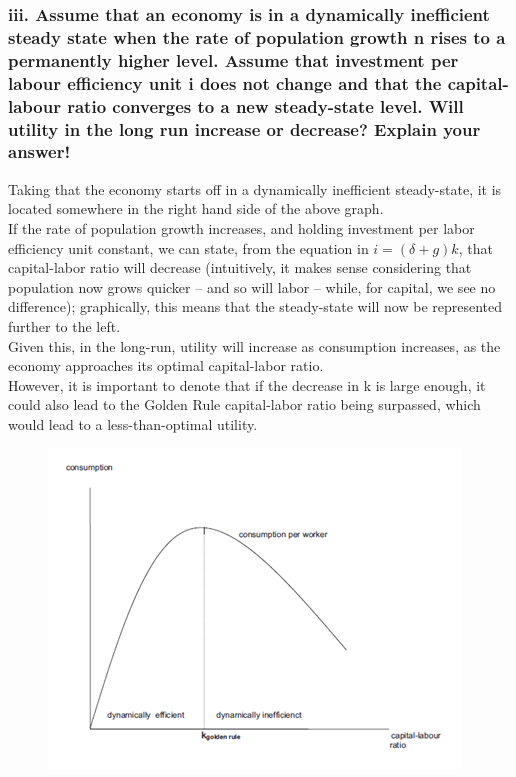 \documentclass[a4paper]{article}
\begin{document}
\subsubsection*{iii. Assume that an economy is in a dynamically inefficient steady state when the rate of population growth n rises to a permanently higher level. Assume that investment per labour efficiency unit i does not change and that the capital-labour ratio converges to a new steady-state level. Will utility in the long run increase or decrease? Explain your answer!}

Taking that the economy starts off in a dynamically inefficient steady-state, it is located somewhere in the right hand side of the above graph. \\ If the rate of population growth increases, and holding investment per labor efficiency unit constant, we can state, from the equation in $i=(\delta+g)k$, that capital-labor ratio will decrease (intuitively, it makes sense considering that population now grows quicker – and so will labor – while, for capital, we see no difference); graphically, this means that the steady-state will now be represented further to the left. \\Given this, in the long-run, utility will increase as consumption increases, as the economy approaches its optimal capital-labor ratio. \\
However, it is important to denote that if the decrease in k is large enough, it could also lead to the Golden Rule capital-labor ratio being surpassed, which would lead to a less-than-optimal utility. \\
\begin{figure}
  \includegraphics[width=\linewidth]{Ass2.png}
 

\end{figure}
\end{document}
